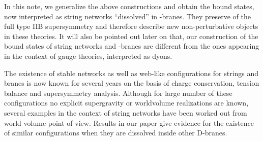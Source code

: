 \documentclass[a4paper,12pt]{article}
\begin{document}
In this note, we generalize the above constructions and obtain the 
bound states, now interpreted as 
\coordHE{} string networks \cite{sen,sandip} ``dissolved'' 
in \coordHE{}-branes. They preserve \coordHE{} of the full type IIB supersymmetry and 
therefore describe new non-perturbative objects in these theories. 
It will also be pointed out later on that, our construction 
of the bound states of string networks and \coordHE{}-branes 
are different from the ones appearing in the context of 
\coordHE{} gauge theories, interpreted as dyons\cite{bergman,hata,hashi}. 

The existence of stable 
networks as well as web-like configurations for strings and branes is
now known for several years \cite{schwarz2} on the
basis of charge conservation, tension balance and supersymmetry analysis.
Although for large number of these configurations no explicit supergravity
or worldvolume realizations are  known,  
several examples in the context of string networks have been 
worked out from world volume point of view\cite{dasg,hata}.
Results in our paper give evidence for the existence of similar
configurations when they are dissolved inside other D-branes.  
 
\end{document}

